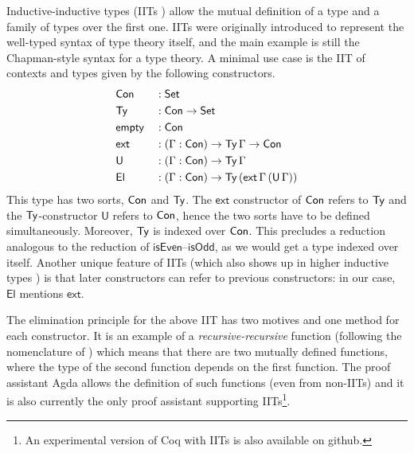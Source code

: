 \documentclass[a4paper,UKenglish,cleveref, autoref]{lipics-v2019}
\begin{document}
Inductive-inductive types (IITs \cite{forsberg-phd}) allow the mutual
definition of a type and a family of types over the first one. IITs
were originally introduced to represent the well-typed syntax of type
theory itself, and the main example is still the Chapman-style
\cite{chapman09eatitself} syntax for a type theory. A minimal use case
is the IIT of contexts and types given by the following constructors.
\begin{alignat*}{5}
  & \mathsf{Con} && : \mathsf{Set} \\
  & \mathsf{Ty} && : \mathsf{Con}\rightarrow\mathsf{Set} \\
  & \mathsf{empty} && : \mathsf{Con} \\
  & \mathsf{ext} && : (\Gamma:\mathsf{Con})\rightarrow\mathsf{Ty}\,\Gamma\rightarrow\mathsf{Con} \\
  & \mathsf{U} && : (\Gamma:\mathsf{Con})\rightarrow\mathsf{Ty}\,\Gamma \\
  & \mathsf{El} && : (\Gamma:\mathsf{Con})\rightarrow\mathsf{Ty}\,(\mathsf{ext}\,\Gamma\,(\mathsf{U}\,\Gamma))
\end{alignat*}
This type has two sorts, $\mathsf{Con}$ and $\mathsf{Ty}$. The $\mathsf{ext}$ constructor of
$\mathsf{Con}$ refers to $\mathsf{Ty}$ and the $\mathsf{Ty}$-constructor $\mathsf{U}$ refers to $\mathsf{Con}$,
hence the two sorts have to be defined simultaneously. Moreover, $\mathsf{Ty}$ is
indexed over $\mathsf{Con}$. This precludes a reduction analogous to the reduction of
$\mathsf{isEven}$--$\mathsf{isOdd}$, as we would get a type indexed over
itself. Another unique feature of IITs (which also shows up in higher inductive
types \cite{HoTTbook}) is that later constructors can refer to previous
constructors: in our case, $\mathsf{El}$ mentions
$\mathsf{ext}$.

The elimination principle for the above IIT has two motives and one method
for each constructor. It is an example of a \emph{recursive-recursive}
function (following the nomenclature of \cite{forsberg-phd}) which
means that there are two mutually defined functions, where the type of
the second function depends on the first function. The proof assistant
Agda \cite{norell07thesis} allows the definition of such functions
(even from non-IITs) and it is also currently the only proof assistant
supporting IITs\footnote{An experimental version of Coq with IITs is also
  available on github.}.
\end{document}
